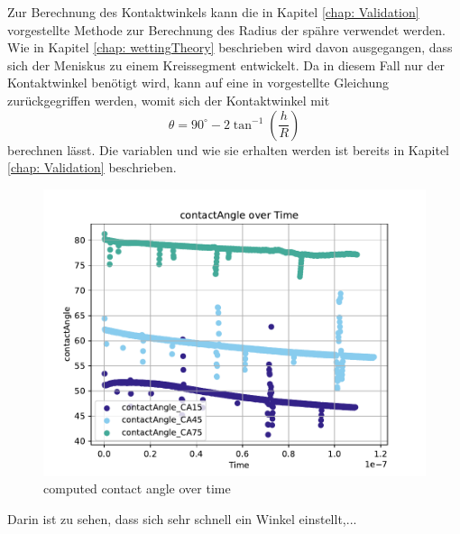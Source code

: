 Zur Berechnung des Kontaktwinkels kann die in Kapitel \ref*{chap: Validation} vorgestellte Methode zur Berechnung des Radius der spähre verwendet werden. Wie in Kapitel \ref*{chap: wettingTheory} beschrieben wird davon ausgegangen, dass sich der Meniskus zu einem Kreissegment entwickelt. Da in diesem Fall nur der Kontaktwinkel benötigt wird, kann auf eine in \cite{buttPhysicsChemistryInterfaces} vorgestellte Gleichung zurückgegriffen werden, womit sich der Kontaktwinkel mit 
\begin{equation}
    \theta = 90^{\circ}- 2\tan^{-1}\left(\frac{h}{R}\right) 
\end{equation}
berechnen lässt. Die variablen und wie sie erhalten werden ist bereits in Kapitel \ref*{chap: Validation} beschrieben. 
\begin{figure}[h]
    \centering
    \includegraphics[width=.95\textwidth]{Pictures/contactAngle_overTime.pdf}
    \caption{computed contact angle over time }
    \label{fig: CA_overTime}
\end{figure}
Darin ist zu sehen, dass sich sehr schnell ein Winkel einstellt,... 






